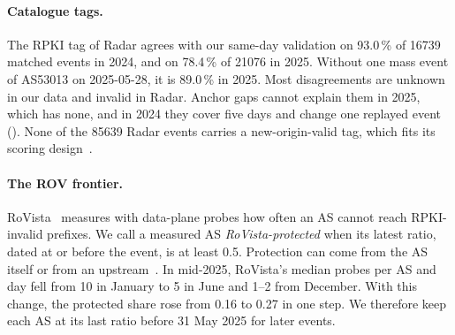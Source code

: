 \paragraph{Catalogue tags.}
The RPKI tag of Radar agrees with our same-day validation on 93.0\,\% of \num{16739} matched events in 2024, and on 78.4\,\% of \num{21076} in 2025.
Without one mass event of AS53013 on 2025-05-28, it is 89.0\,\% in 2025.
Most disagreements are unknown in our data and invalid in Radar.
Anchor gaps cannot explain them in 2025, which has none, and in 2024 they cover five days and change one replayed event ().
None of the \num{85639} Radar events carries a new-origin-valid tag, which fits its scoring design~\cite{li2026demystifying}.

\paragraph{The ROV frontier.}
RoVista~\cite{li2023rovista,rovista_data} measures with data-plane probes how often an AS cannot reach RPKI-invalid prefixes.
We call a measured AS \emph{RoVista-protected} when its latest ratio, dated at or before the event, is at least 0.5.
Protection can come from the AS itself or from an upstream~\cite{li2026rscope}.
In mid-2025, RoVista's median probes per AS and day fell from 10 in January to 5 in June and 1--2 from December.
With this change, the protected share rose from 0.16 to 0.27 in one step.
We therefore keep each AS at its last ratio before 31 May 2025 for later events.

